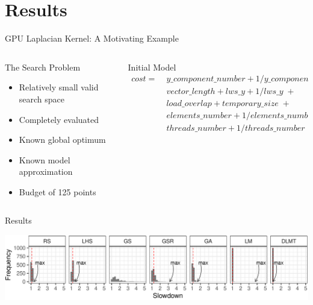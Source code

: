 \documentclass[10pt, compress, aspectratio=169, xcolor={table,usenames,dvipsnames}]{beamer}
\begin{document}
\section{Results}
\label{sec:orgc984430}
\begin{frame}[label={sec:org6175e4a}]{GPU Laplacian Kernel: A Motivating Example}
\begin{columns}
\begin{column}{0.5\columnwidth}
\begin{block}{The Search Problem}
\begin{itemize}
\item Relatively \alert{small valid search space}
\item \alert{Completely evaluated}
\item Known \alert{global optimum}
\item Known \alert{model approximation}
\item \alert{Budget} of \alert{125 points}
\end{itemize}
\end{block}
\end{column}

\begin{column}{0.5\columnwidth}
\begin{block}{Initial Model}
\footnotesize
\begin{align*}
cost = & \; y\_component\_number + 1 / y\_component\_number \; + \\
& \; vector\_length + lws\_y + 1 / lws\_y \; + \\
& \; load\_overlap + temporary\_size \; + \\
& \; elements\_number + 1 / elements\_number \; + \\
& \; threads\_number + 1 / threads\_number
\end{align*}
\normalsize
\end{block}
\end{column}
\end{columns}

\begin{block}{Results}
\vspace{-.3cm}

\begin{center}
\begin{center}
\includegraphics[width=.88\columnwidth]{../../../img/comparison_histogram.pdf}
\end{center}
\end{center}
\end{block}
\end{frame}
\end{document}
